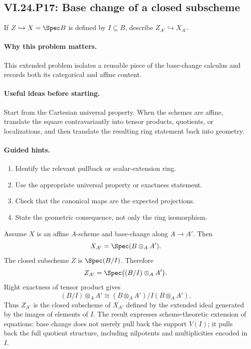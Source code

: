 \subsection*{VI.24.P17: Base change of a closed subscheme}
\begin{problem}\label{prob:vi24-p17}
If $Z\hookrightarrow X=\Spec B$ is defined by $I\subseteq B$, describe $Z_{A'}\hookrightarrow X_{A'}$.
\end{problem}

\ifdefined\FullProblemDossiers
\paragraph{Why this problem matters.}
This extended problem isolates a reusable piece of the base-change calculus and records both its categorical and affine content.

\paragraph{Useful ideas before starting.}
Start from the Cartesian universal property.  When the schemes are affine, translate the square contravariantly into tensor products, quotients, or localizations, and then translate the resulting ring statement back into geometry.

\paragraph{Guided hints.}
\begin{enumerate}
\item Identify the relevant pullback or scalar-extension ring.
\item Use the appropriate universal property or exactness statement.
\item Check that the canonical maps are the expected projections.
\item State the geometric consequence, not only the ring isomorphism.
\end{enumerate}

\begin{solution}
Assume $X$ is an affine $A$-scheme and base-change along $A\to A'$.  Then
\[
X_{A'}=\Spec(B\otimes_AA').
\]
The closed subscheme $Z$ is $\Spec(B/I)$.  Therefore
\[
Z_{A'}=\Spec\bigl((B/I)\otimes_AA'\bigr).
\]
Right exactness of tensor product gives
\[
(B/I)\otimes_AA'\cong(B\otimes_AA')/I(B\otimes_AA').
\]
Thus $Z_{A'}$ is the closed subscheme of $X_{A'}$ defined by the extended ideal generated by the images of elements of $I$.  The result expresses scheme-theoretic extension of equations: base change does not merely pull back the support $V(I)$; it pulls back the full quotient structure, including nilpotents and multiplicities encoded in $I$.
\end{solution}

